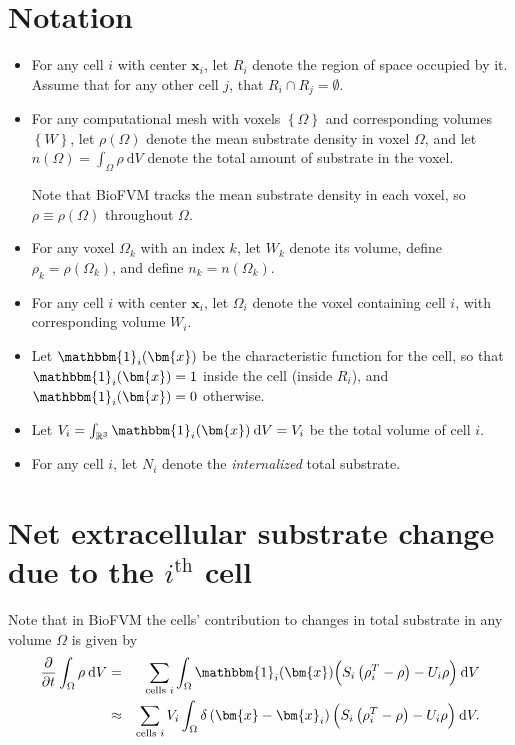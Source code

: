 \documentclass[11point]{article}
\newcommand{\beq}{\begin{eqnarray}}
\newcommand{\eeq}{\end{eqnarray}}
\renewcommand{\d}[1]{\:\mathrm{d}#1}
\renewcommand{\vec}[1]{\bm{#1}}
\newcommand{\one}{\mathbbm{1}}
\newcommand{\reals}{\mathbb{R}}
\newcommand{\df}[1]{\delta \left( #1 \right)}
\newcommand{\set}[1]{\left\{#1\right\}}
\begin{document}
\section{Notation}
\begin{itemize}
\item
For any cell $i$ with center $\vec{x}_i$, let $R_i$ denote the 
region of space occupied by it. Assume that for any other cell 
$j$, that $R_i \cap R_j = \emptyset$. 
\item 
For any  computational 
mesh with voxels $\set{ \Omega }$ and corresponding 
volumes $\set{W}$, let $\rho( \Omega) $ denote the mean 
substrate density in voxel $\Omega$, and let 
$n(\Omega) = \int_\Omega \rho \d{V}$ denote the total
 amount of substrate in the voxel. 

Note that BioFVM tracks the mean substrate density in each voxel, 
so $\rho \equiv \rho( \Omega )$ throughout $\Omega$. 
\item 
For any voxel $\Omega_k$ with an index $k$, let $W_k$ denote 
its volume, define $\rho_k = \rho( \Omega_k )$, and 
define $n_k = n( \Omega_k)$. 

\item 
For any cell $i$ with center $\vec{x}_i$, let $\Omega_i$ denote the 
voxel containing cell $i$, with corresponding volume $W_i$. 
\item
Let $\one_i(\vec{x})$ be the characteristic  function for the cell, so that 
$\one_i(\vec{x}) =1$ inside the cell (inside $R_i$), and 
$\one_i(\vec{x}) = 0$ otherwise. 
\item 
Let $V_i = \int_{\reals^3} \one_i(\vec{x}) \d{V} = V_i$ be the total volume of cell $i$. 
\item 
For any cell $i$, let $N_i$ denote the \emph{internalized} total substrate. 

\end{itemize}

\section{Net extracellular substrate change 
due to the $i^\textrm{th}$ cell}
Note that in BioFVM the cells' contribution 
to changes in total substrate in any volume $\Omega$ is given by 
\beq
\frac{ \partial }{ \partial t} 
\int_\Omega \rho \d{V} & = &  
\sum_{\textrm{cells } i} 
\int_\Omega  \one_i(\vec{x})
\Bigl(  S_i \left( \rho^T_i - \rho \right)  - U_i \rho   \Bigr) \d{V}\\
& \approx & 
\sum_{\textrm{cells } i}
V_i \int_\Omega \df{ \vec{x} - \vec{x}_i }
\Bigl(  S_i \left( \rho^T_i - \rho \right)  - U_i \rho   \Bigr) \d{V}.
\eeq 
\end{document}
